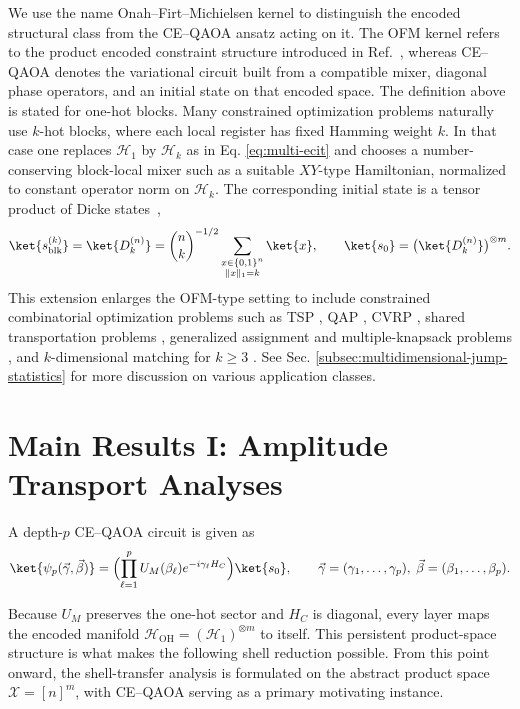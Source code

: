 \documentclass[a4paper,onecolumn,11pt,unpublished]{quantumarticle}
\theoremstyle{remark}
\newcommand{\OH}{\mathcal{H}_{\mathrm{OH}}}
\begin{document}
We use the name Onah--Firt--Michielsen kernel to distinguish the encoded structural class from the CE--QAOA ansatz acting on it. The OFM kernel refers to the product encoded constraint structure introduced in Ref.~\cite{onahce}, whereas CE--QAOA denotes the variational circuit built from a compatible mixer, diagonal phase operators, and an initial state on that encoded space. The definition above is stated for one-hot blocks. Many constrained
optimization problems naturally use \(k\)-hot blocks, where each local register has fixed Hamming weight \(k\). In that case one replaces \(\mathcal H_1\) by \(\mathcal H_k\) as in Eq. \ref{eq:multi-ecit} and chooses a number-conserving block-local mixer such as a suitable \(XY\)-type Hamiltonian, normalized to constant operator norm on \(\mathcal H_k\). The corresponding initial state is a tensor product of Dicke
states~\cite{B_rtschi_2019,yu2026efficient},
\[
\ket{s_{\mathrm{blk}}^{(k)}}
=
\ket{D^{(n)}_{k}}
=
\binom{n}{k}^{-1/2}
\sum_{\substack{x\in\{0,1\}^n\\ \|x\|_1=k}}
\ket{x},
\qquad
\ket{s_0}
=
\bigl(\ket{D^{(n)}_{k}}\bigr)^{\otimes m}.
\]
This extension enlarges the OFM-type setting to include constrained
combinatorial optimization problems such as TSP \cite{Lucas2014,GareyJohnson1979}, QAP
\cite{Loiola2007QAPSurvey}, CVRP \cite{TothVigo2014VRP}, shared
transportation problems \cite{onah2025waas}, generalized assignment and multiple-knapsack problems \cite{SahniGonzalez1976GAP}, and \(k\)-dimensional matching for \(k\ge3\) \cite{Karp1972}. See Sec. \ref{subsec:multidimensional-jump-statistics} for more discussion on various application classes. 






\section{Main Results I: Amplitude Transport Analyses}
\label{sec:results}


A depth-\(p\) CE--QAOA circuit is given as
\begin{equation}
\ket{\psi_p(\vec\gamma,\vec\beta)}
=
\Bigl(\prod_{\ell=1}^{p}U_M(\beta_\ell)e^{-i\gamma_\ell H_C}\Bigr)\ket{s_0},
\qquad
\vec\gamma=(\gamma_1,\dots,\gamma_p),\;
\vec\beta=(\beta_1,\dots,\beta_p).
\end{equation}

Because \(U_M\) preserves the one-hot sector and \(H_C\) is diagonal, every
layer maps the encoded manifold \(\OH=(\mathcal H_1)^{\otimes m}\) to itself. This persistent  product-space structure is what makes the following shell reduction possible. From this point onward, the shell-transfer analysis is formulated on the abstract product space \(\mathcal X=[n]^m\), with CE--QAOA serving as a primary motivating instance.
\end{document}
